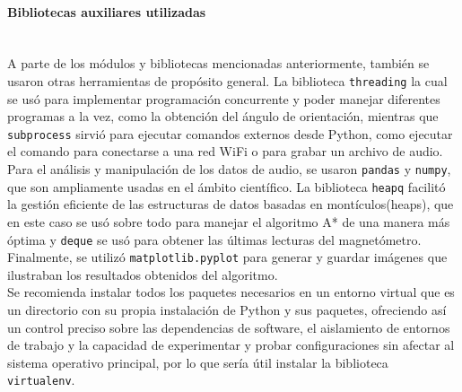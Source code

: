 \paragraph{Bibliotecas auxiliares utilizadas} \hspace{0pt} \\

A parte de los módulos y bibliotecas mencionadas anteriormente, también se usaron otras herramientas de propósito general. La biblioteca \texttt{threading} la cual se usó para implementar programación concurrente y poder manejar diferentes programas a la vez, como la obtención del ángulo de orientación, mientras que \texttt{subprocess} sirvió para ejecutar comandos externos desde Python, como ejecutar el comando para conectarse a una red WiFi o para grabar un archivo de audio. Para el análisis y manipulación de los datos de audio, se usaron \texttt{pandas} y \texttt{numpy}, que son ampliamente usadas en el ámbito científico. La biblioteca \texttt{heapq} facilitó la gestión eficiente de las estructuras de datos basadas en montículos(heaps), que en este caso se usó sobre todo para manejar el algoritmo A* de una manera más óptima y \texttt{deque} se usó para obtener las últimas lecturas del magnetómetro. Finalmente, se utilizó \texttt{matplotlib.pyplot} para generar y guardar imágenes que ilustraban los resultados obtenidos del algoritmo.\\

Se recomienda instalar todos los paquetes necesarios en un entorno virtual que es un directorio con su propia instalación de Python y sus paquetes, ofreciendo así un control preciso sobre las dependencias de software, el aislamiento de entornos de trabajo y la capacidad de experimentar y probar configuraciones sin afectar al sistema operativo principal, por lo que sería útil instalar la biblioteca \texttt{virtualenv}.



